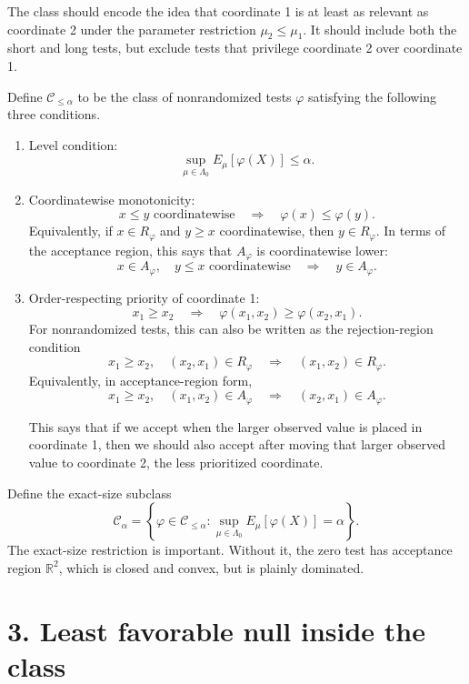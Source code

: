 \documentclass[11pt]{article}
\begin{document}
The class should encode the idea that coordinate 1 is at least as relevant as coordinate 2 under the parameter restriction \(\mu_2\le\mu_1\). It should include both the short and long tests, but exclude tests that privilege coordinate 2 over coordinate 1.

Define \(\mathcal C_{\le \alpha}\) to be the class of nonrandomized tests \(\varphi\) satisfying the following three conditions.

\begin{enumerate}[label=(\roman*)]
\item Level condition:
\[
\sup_{\mu\in\Lambda_0}E_\mu[\varphi(X)]\le\alpha.
\]

\item Coordinatewise monotonicity:
\[
x\le y\text{ coordinatewise}
\quad\Longrightarrow\quad
\varphi(x)\le\varphi(y).
\]
Equivalently, if \(x\in R_\varphi\) and \(y\ge x\) coordinatewise, then \(y\in R_\varphi\). In terms of the acceptance region, this says that \(A_\varphi\) is coordinatewise lower:
\[
x\in A_\varphi,
\quad
y\le x\text{ coordinatewise}
\quad\Longrightarrow\quad
y\in A_\varphi.
\]

\item Order-respecting priority of coordinate 1:
\[
x_1\ge x_2
\quad\Longrightarrow\quad
\varphi(x_1,x_2)\ge \varphi(x_2,x_1).
\]
For nonrandomized tests, this can also be written as the rejection-region condition
\[
x_1\ge x_2,
\quad
(x_2,x_1)\in R_\varphi
\quad\Longrightarrow\quad
(x_1,x_2)\in R_\varphi.
\]
Equivalently, in acceptance-region form,
\[
x_1\ge x_2,
\quad
(x_1,x_2)\in A_\varphi
\quad\Longrightarrow\quad
(x_2,x_1)\in A_\varphi.
\]

This says that if we accept when the larger observed value is placed in coordinate 1, then we should also accept after moving that larger observed value to coordinate 2, the less prioritized coordinate.
\end{enumerate}

Define the exact-size subclass
\[
\mathcal C_\alpha=
\left\{\varphi\in\mathcal C_{\le \alpha}:
\sup_{\mu\in\Lambda_0}E_\mu[\varphi(X)]=\alpha
\right\}.
\]
The exact-size restriction is important. Without it, the zero test has acceptance region \(\mathbb R^2\), which is closed and convex, but is plainly dominated.

\section*{3. Least favorable null inside the class}
\end{document}
